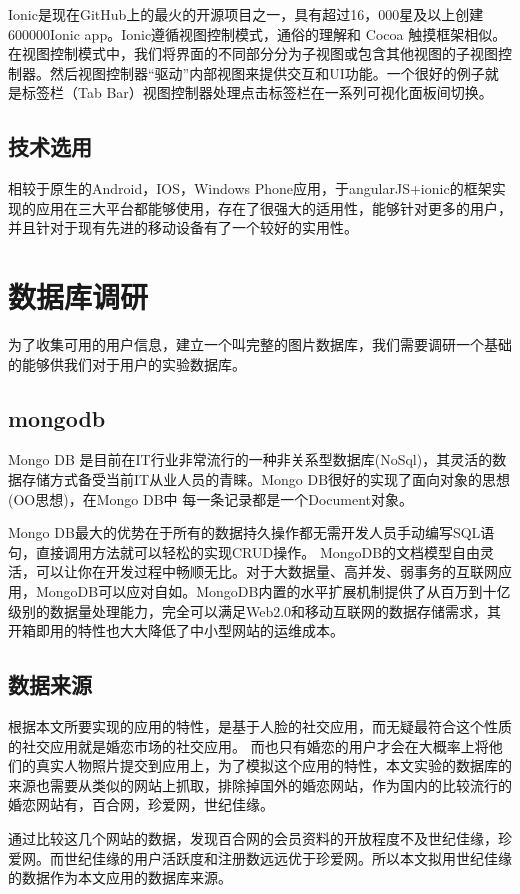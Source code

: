 Ionic是现在GitHub上的最火的开源项目之一，具有超过16，000星及以上创建600000Ionic app。Ionic遵循视图控制模式，通俗的理解和 Cocoa 触摸框架相似。在视图控制模式中，我们将界面的不同部分分为子视图或包含其他视图的子视图控制器。然后视图控制器“驱动”内部视图来提供交互和UI功能。一个很好的例子就是标签栏（Tab Bar）视图控制器处理点击标签栏在一系列可视化面板间切换。
\subsection{技术选用}
相较于原生的Android，IOS，Windows Phone应用，于angularJS+ionic的框架实现的应用在三大平台都能够使用，存在了很强大的适用性，能够针对更多的用户，并且针对于现有先进的移动设备有了一个较好的实用性。
\section{数据库调研}
为了收集可用的用户信息，建立一个叫完整的图片数据库，我们需要调研一个基础的能够供我们对于用户的实验数据库。
\subsection{mongodb}
Mongo DB 是目前在IT行业非常流行的一种非关系型数据库(NoSql)，其灵活的数据存储方式备受当前IT从业人员的青睐。Mongo DB很好的实现了面向对象的思想(OO思想)，在Mongo DB中 每一条记录都是一个Document对象。

Mongo DB最大的优势在于所有的数据持久操作都无需开发人员手动编写SQL语句，直接调用方法就可以轻松的实现CRUD操作。
MongoDB的文档模型自由灵活，可以让你在开发过程中畅顺无比。对于大数据量、高并发、弱事务的互联网应用，MongoDB可以应对自如。MongoDB内置的水平扩展机制提供了从百万到十亿级别的数据量处理能力，完全可以满足Web2.0和移动互联网的数据存储需求，其开箱即用的特性也大大降低了中小型网站的运维成本。

\subsection{数据来源}
根据本文所要实现的应用的特性，是基于人脸的社交应用，而无疑最符合这个性质的社交应用就是婚恋市场的社交应用。
而也只有婚恋的用户才会在大概率上将他们的真实人物照片提交到应用上，为了模拟这个应用的特性，本文实验的数据库的来源也需要从类似的网站上抓取，排除掉国外的婚恋网站，作为国内的比较流行的婚恋网站有，百合网，珍爱网，世纪佳缘。


通过比较这几个网站的数据，发现百合网的会员资料的开放程度不及世纪佳缘，珍爱网。而世纪佳缘的用户活跃度和注册数远远优于珍爱网。所以本文拟用世纪佳缘的数据作为本文应用的数据库来源。

